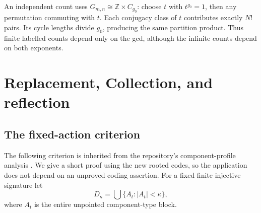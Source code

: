 \documentclass[11pt,letterpaper]{article}
\numberwithin{equation}{section}
\theoremstyle{plain}
\theoremstyle{definition}
\theoremstyle{remark}
\newcommand{\ZZ}{\mathbb Z}
\begin{document}
An independent count uses $G_{m,n}\cong\ZZ\times C_{g_0}$:
choose $t$ with $t^{g_0}=1$, then any permutation
commuting with $t$. Each conjugacy class of $t$
contributes exactly $N!$ pairs. Its cycle lengths
divide $g_0$, producing the same partition product.
Thus finite labelled counts depend only on the gcd,
although the infinite counts depend on both exponents.

\section{Replacement, Collection, and reflection}\label{nee:aa:sec:replacement}
\label{nee:ci:sec:profile}
\label{nee:ci:sec:thresholds}
\label{nee:ci:sec:collection}

\subsection{The fixed-action criterion}

The following criterion is inherited from the repository's component-profile
analysis \cite{RepoNamingIII}. We give a short proof using the new rooted codes,
so the application does not depend on an unproved coding assertion.
For a fixed finite injective signature let
\[
D_\kappa=\bigcup\{A_t:|A_t|<\kappa\},
\]
where $A_t$ is the entire unpointed component-type block.
\end{document}
